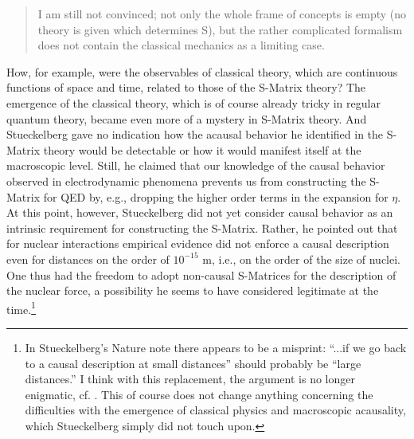 \documentclass[12pt,a4paper]{article}
\begin{document}
\begin{quote}
I am still not convinced; not only the whole frame of concepts is empty (no theory is given which determines S), but the rather complicated formalism does not contain the classical mechanics as a limiting case.
\end{quote}

How, for example, were the observables of classical theory, which are continuous functions of space and time, related to those of the S-Matrix theory? The emergence of the classical theory, which is of course already tricky in regular quantum theory, became even more of a mystery in S-Matrix theory. And Stueckelberg gave no indication how the acausal behavior he identified in the S-Matrix theory would be detectable or how it would manifest itself at the macroscopic level. Still, he claimed that our knowledge of the causal behavior observed in electrodynamic phenomena prevents us from constructing the S-Matrix for QED by, e.g., dropping the higher order terms in the expansion for $\eta$. At this point, however, Stueckelberg did not yet consider causal behavior as an intrinsic requirement for constructing the S-Matrix. Rather, he pointed out that for nuclear interactions empirical evidence did not enforce a causal description even for distances on the order of $10^{-15}$ m, i.e., on the order of the size of nuclei. One thus had the freedom to adopt non-causal S-Matrices for the description of the nuclear force, a possibility he seems to have considered legitimate at the time.\footnote{In Stueckelberg's Nature note there appears to be a misprint: ``...if we go back to a causal description at small distances'' should probably be ``large distances.'' I think with this replacement, the argument is no longer enigmatic, cf. \citep[p.96]{wanders_2009_stueckelberg}. This of course does not change anything concerning the difficulties with the emergence of classical physics and macroscopic acausality, which Stueckelberg simply did not touch upon.}
\end{document}
